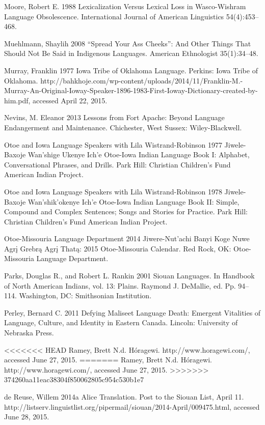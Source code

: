 \documentclass[output=paper]{LSP/langsci}
\begin{document}
\begin{reflist}
Moore, Robert E. 1988 Lexicalization Versus Lexical Loss in Wasco-Wishram Language Obsolescence. International Journal of American Linguistics 54(4):453--468.

Muehlmann, Shaylih 2008 ``Spread Your Ass Cheeks'': And Other Things That Should Not Be Said in Indigenous Languages. American Ethnologist 35(1):34--48.

Murray, Franklin 1977 Iowa Tribe of Oklahoma Language. Perkins: Iowa Tribe of Oklahoma. http://bahkhoje.com/wp-content/uploads/2014/11/Franklin-M.-Murray-An-Original-Ioway-Speaker-1896-1983-First-Ioway-Dictionary-created-by-him.pdf, accessed April 22, 2015.

Nevins, M. Eleanor 2013 Lessons from Fort Apache: Beyond Language Endangerment and Maintenance. Chichester, West Sussex: Wiley-Blackwell.

Otoe and Iowa Language Speakers with Lila Wistrand-Robinson 1977 Jiwele-Baxoje Wan'shige Ukenye Ich'e Otoe-Iowa Indian Language Book I: Alphabet, Conversational Phrases, and Drills. Park Hill: Christian Children's Fund American Indian Project.

Otoe and Iowa Language Speakers with Lila Wistrand-Robinson 1978 Jiwele-Baxoje Wan'shik'okenye Ich'e Otoe-Iowa Indian Language Book II: Simple, Compound and Complex Sentences; Songs and Stories for Practice. Park Hill: Christian Children's Fund American Indian Project.

Otoe-Missouria Language Department 2014 Jiwere-Nut'achi Banyi Koge Nuwe Agr\k{i} Grebr\k{a} Agr\k{i} That\k{a}: 2015 Otoe-Missouria Calendar. Red Rock, OK: Otoe-Missouria Language Department.

Parks, Douglas R., and Robert L. Rankin 2001 Siouan Languages. In Handbook of North American Indians, vol. 13: Plains. Raymond J. DeMallie, ed. Pp. 94--114. Washington, DC: Smithsonian Institution.

Perley, Bernard C. 2011 Defying Maliseet Language Death: Emergent Vitalities of Language, Culture, and Identity in Eastern Canada. Lincoln: University of Nebraska Press.

<<<<<<< HEAD
Ramey, Brett N.d. Hóragewi. http://www.horagewi.com/, accessed June 27, 2015.
=======
Ramey, Brett N.d. H\'oragewi. http://www.horagewi.com/, accessed June 27, 2015.
>>>>>>> 374260aa11eac38304f850062805c954c530b1e7

de Reuse, Willem 2014a Alice Translation. Post to the Siouan List, April 11. http://listserv.linguistlist.org/pipermail/siouan/2014-April/009475.html, accessed June 28, 2015.


\end{reflist}
\end{document}
